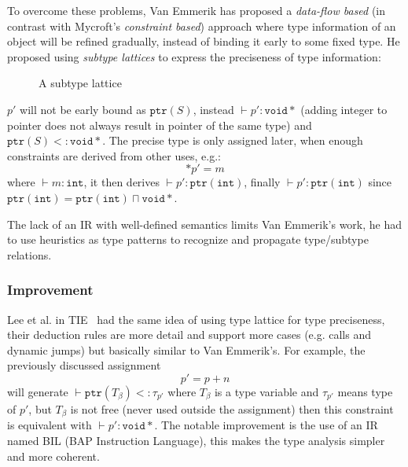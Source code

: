 \documentclass[compsoc,conference,a4paper,10pt,times]{IEEEtran}
\begin{document}
To overcome these problems, Van Emmerik has proposed a \emph{data-flow based}
(in contrast with Mycroft's \emph{constraint based}) approach where type information of an object will be refined gradually,
instead of binding it early to some fixed type. He proposed using \emph{subtype lattices} to express the
preciseness of type information:
\begin{figure}[h]
  \centering
  \caption{A subtype lattice}
\end{figure}
$p'$ will not be early bound as $\mathtt{ptr}(S)$, instead $\vdash p' \colon \mathtt{void*}$
(adding integer to pointer does not always result in pointer of the same type) and
$\mathtt{ptr}(S) <\colon \mathtt{void*}$. The precise type
is only assigned later, when enough constraints are derived from other uses, e.g.:
\begin{equation*}
  *{p'} = m
\end{equation*}
where $\vdash m \colon \mathtt{int}$, it then derives $\vdash p' \colon \mathtt{ptr}(\mathtt{int})$,
finally $\vdash p' \colon \mathtt{ptr}(\mathtt{int})$ since
$\mathtt{ptr}(\mathtt{int}) = \mathtt{ptr}(\mathtt{int}) \sqcap \mathtt{void*}$.

The lack of an IR with well-defined semantics limits Van Emmerik's work, he had to use heuristics as
type patterns to recognize and propagate type/subtype relations.

\subsubsection*{Improvement}
\noindent
Lee et al. in TIE~\cite{lee_tie_2011} had the same idea of using type lattice for type preciseness,
their deduction rules are more detail and support more cases
(e.g. calls and dynamic jumps) but basically similar to Van Emmerik's. For example,
the previously discussed assignment
\begin{equation*}
  p' = p + n
\end{equation*}
will generate $\vdash \mathtt{ptr}(T_{\beta}) <\colon \tau_{p'}$ where $T_{\beta}$ is
a type variable and $\tau_{p'}$ means type of $p'$, but $T_{\beta}$ is not free (never used outside
the assignment) then this constraint is equivalent with $\vdash p' \colon \mathtt{void*}$. The notable
improvement is the use of an IR named BIL (BAP Instruction Language), this makes the type analysis
simpler and more coherent.
\end{document}
